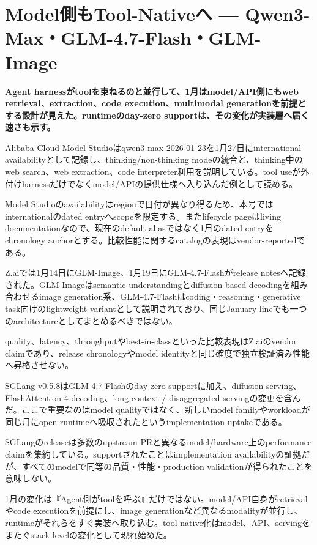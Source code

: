 \section{Model側もTool-Nativeへ — Qwen3-Max・GLM-4.7-Flash・GLM-Image}
\label{pkg:tool-native-models}
\noindent\textbf{Agent harnessがtoolを束ねるのと並行して、1月はmodel/API側にもweb retrieval、extraction、code execution、multimodal generationを前提とする設計が見えた。runtimeのday-zero supportは、その変化が実装層へ届く速さも示す。}\autocite{src-6a97353d35a9,src-9156c37fb1c2,src-eac8dfbeb78c}

Alibaba Cloud Model Studioはqwen3-max-2026-01-23を1月27日にinternational availabilityとして記録し、thinking/non-thinking modeの統合と、thinking中のweb search、web extraction、code interpreter利用を説明している。tool useが外付けharnessだけでなくmodel/APIの提供仕様へ入り込んだ例として読める。\autocite{src-eac8dfbeb78c}


\begin{claimboundary}
Model Studioのavailabilityはregionで日付が異なり得るため、本号ではinternationalのdated entryへscopeを限定する。またlifecycle pageはliving documentationなので、現在のdefault aliasではなく1月のdated entryをchronology anchorとする。比較性能に関するcatalogの表現はvendor-reportedである。\autocite{src-eac8dfbeb78c}
\end{claimboundary}

Z.aiでは1月14日にGLM-Image、1月19日にGLM-4.7-Flashがrelease notesへ記録された。GLM-Imageはsemantic understandingとdiffusion-based decodingを組み合わせるimage generation系、GLM-4.7-Flashはcoding・reasoning・generative task向けのlightweight variantとして説明されており、同じJanuary lineでも一つのarchitectureとしてまとめるべきではない。\autocite{src-9156c37fb1c2}


\begin{claimboundary}
quality、latency、throughputやbest-in-classといった比較表現はZ.aiのvendor claimであり、release chronologyやmodel identityと同じ確度で独立検証済み性能へ昇格させない。\autocite{src-9156c37fb1c2}
\end{claimboundary}

SGLang v0.5.8はGLM-4.7-Flashのday-zero supportに加え、diffusion serving、FlashAttention 4 decoding、long-context / disaggregated-servingの変更を含んだ。ここで重要なのはmodel qualityではなく、新しいmodel familyやworkloadが同じ月にopen runtimeへ吸収されたというimplementation uptakeである。\autocite{src-6a97353d35a9}


\begin{claimboundary}
SGLangのreleaseは多数のupstream PRと異なるmodel/hardware上のperformance claimを集約している。supportされたことはimplementation availabilityの証拠だが、すべてのmodelで同等の品質・性能・production validationが得られたことを意味しない。\autocite{src-6a97353d35a9}
\end{claimboundary}

1月の変化は『Agent側がtoolを呼ぶ』だけではない。model/API自身がretrievalやcode executionを前提にし、image generationなど異なるmodalityが並行し、runtimeがそれらをすぐ実装へ取り込む。tool-native化はmodel、API、servingをまたぐstack-levelの変化として現れ始めた。\autocite{src-6a97353d35a9,src-9156c37fb1c2,src-eac8dfbeb78c}
